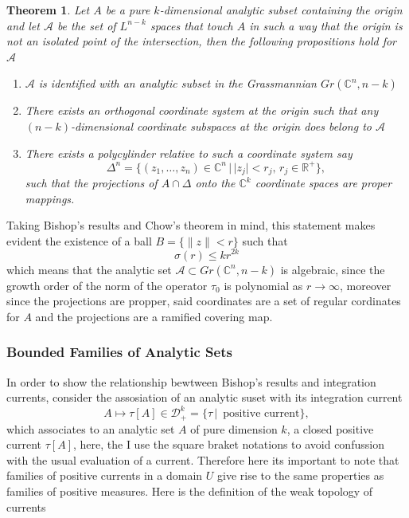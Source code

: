 \documentclass[12pt,twoside,a4paper]{report}
\newtheorem{theorem}{Theorem}[section]
\newcommand{\re}{\ensuremath{\mathbb R }}
\newcommand{\co}{\ensuremath{\mathbb C }}
\newcommand{\con}{\ensuremath{\mathbb{C}^n}}
\newcommand{\dsheaf}{\ensuremath{\mathcal D }}
\begin{document}
\begin{theorem}
Let $A$ be a pure $k$-dimensional analytic subset containing the origin and let $\mathcal{A}$ be the set of $L^{n-k}$ spaces that touch $A$ in such a way that the origin is not an isolated point of the intersection, then the following propositions hold for $\mathcal{A}$
\begin{enumerate}
\item $\mathcal{A}$ is identified with an analytic subset in the Grassmannian \(Gr(\con,n-k)\)

\item There exists an orthogonal coordinate system at the origin such that any $(n-k)$-dimensional coordinate subspaces at the origin does belong to $\mathcal{A}$

\item There exists a polycylinder relative to such a coordinate system say
\[
    \Delta^n=\{(z_1,\dots,z_n)\in\con\,|\,|z_j|<r_j,\,r_j\in\re^+\},
\]
such that the projections of $A\cap\Delta$ onto the $\co^{k}$ coordinate spaces are proper mappings.
\end{enumerate}
\end{theorem}
Taking Bishop's results and Chow's theorem in mind, this statement makes evident the existence of a ball $B=\{\|z\|<r\}$ such that
\[
        \sigma(r)\leq kr^{2k}
\]
which means that the analytic set \(\mathcal{A}\subset Gr(\con,n-k)\) is algebraic, since the growth order of the norm of the operator $\tau_0$ is polynomial as $r\to\infty$, moreover since the projections are propper, said coordinates are a set of regular cordinates for $A$ and the projections are a ramified covering map.

\subsubsection{Bounded Families of Analytic Sets}
In order to show the relationship bewtween Bishop's results and integration currents, consider the assosiation of an analytic suset with its integration current
\[
    A\mapsto \tau[A]\in\dsheaf^k_{+}=\{\tau\,|\,\text{ positive current}\},
\]
\noindent which associates to an analytic set $A$ of pure dimension $k$, a closed positive current $\tau[A]$, here, the I use the square braket notations to avoid confussion with the usual evaluation of a current. Therefore here its important to note that families of positive currents in a domain $U$ give rise to the same properties as families of positive measures. Here is the definition of the weak topology of currents
\end{document}
